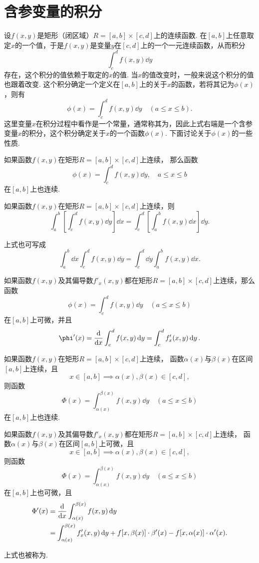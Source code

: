 \section{含参变量的积分}
设\(f(x,y)\)是矩形（闭区域）\(R = [a,b]\times[c,d]\)上的连续函数.
在\([a,b]\)上任意取定\(x\)的一个值，于是\(f(x,y)\)是变量\(y\)在\([c,d]\)上的一个一元连续函数，从而积分\[
\int_c^d f(x,y) \dd{y}
\]存在，这个积分的值依赖于取定的\(x\)的值.
当\(x\)的值改变时，一般来说这个积分的值也跟着改变.
这个积分确定一个定义在\([a,b]\)上的关于\(x\)的函数，若将其记为\(\phi(x)\)，则有\[
\phi(x) = \int_c^d f(x,y) \dd{y}
\quad(a \leq x \leq b).
\]这里变量\(x\)在积分过程中看作是一个常量，通常称其为，因此上式右端是一个含参变量\(x\)的积分，这个积分确定关于\(x\)的一个函数\(\phi(x)\).
下面讨论关于\(\phi(x)\)的一些性质.

\begin{theorem}
如果函数\(f(x,y)\)在矩形\(R=[a,b]\times[c,d]\)上连续，
那么函数\[
\phi(x) = \int_c^d{f(x,y)\dd{y}}, \quad a \leq x \leq b
\]在\([a,b]\)上也连续.
\end{theorem}

\begin{theorem}
如果函数\(f(x,y)\)在矩形\(R=[a,b]\times[c,d]\)上连续，则\[
\int_a^b\left[\int_c^d f(x,y) \dd{y}\right] \dd{x}
=\int_c^d\left[\int_a^b f(x,y) \dd{x}\right] \dd{y}.
\]
\end{theorem}
上式也可写成\[
\int_a^b \dd{x} \int_c^d f(x,y) \dd{y}
=\int_c^d \dd{y} \int_a^b f(x,y) \dd{x}.
\]

\begin{theorem}
如果函数\(f(x,y)\)及其偏导数\(f'_x(x,y)\)都在矩形\(R=[a,b]\times[c,d]\)上连续，那么函数\[
\phi(x) = \int_c^d f(x,y) \dd{y}
\quad(a \leq x \leq b)
\]在\([a,b]\)上可微，并且\[
\phi'(x) = \dv{x} \int_c^d f(x,y) \dd{y}
= \int_c^d f'_x(x,y) \dd{y}.
\]
\end{theorem}

\begin{theorem}
如果函数\(f(x,y)\)在矩形\(R=[a,b]\times[c,d]\)上连续，
函数\(\alpha(x)\)与\(\beta(x)\)在区间\([a,b]\)上连续，且\[
x \in [a,b] \implies \alpha(x),\beta(x) \in [c,d],
\]则函数\[
\Phi(x) = \int_{\alpha(x)}^{\beta(x)} f(x,y)\dd{y}
\quad(a \leq x \leq b)
\]在\([a,b]\)上也连续.
\end{theorem}

\begin{theorem}
如果函数\(f(x,y)\)及其偏导数\(f'_x(x,y)\)都在矩形\(R=[a,b]\times[c,d]\)上连续，
函数\(\alpha(x)\)与\(\beta(x)\)在区间\([a,b]\)上可微，且\[
x \in [a,b] \implies \alpha(x),\beta(x) \in [c,d],
\]则函数\[
\Phi(x) = \int_{\alpha(x)}^{\beta(x)} f(x,y)\dd{y}
\quad(a \leq x \leq b)
\]在\([a,b]\)上也可微，且\begin{align*}
\Phi'(x) &= \dv{x} \int_{\alpha(x)}^{\beta(x)} f(x,y) \dd{y} \\
&= \int_{\alpha(x)}^{\beta(x)} f'_x(x,y) \dd{y}
	+ f[x,\beta(x)] \cdot \beta'(x)
	- f[x,\alpha(x)] \cdot \alpha'(x).
\end{align*}
\end{theorem}
上式也被称为.

